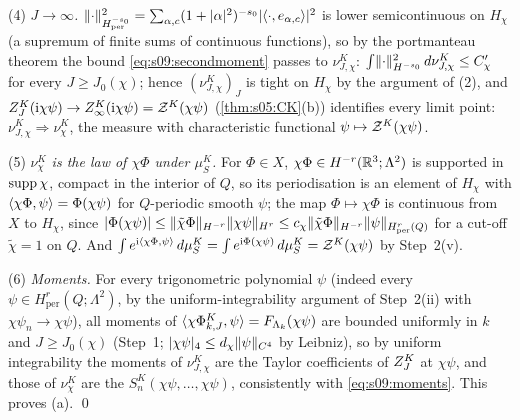 (4) \emph{$J\to\infty$.} $\lVert \cdot\rVert^2_{H^{-s_0}_{\mathrm{per}}}=\sum_{\alpha,c}(1+|\alpha|^2)^{-s_0}|\langle \cdot,e_{\alpha,c}\rangle|^2$ is lower semicontinuous on $H_\chi$ (a supremum of finite sums of continuous functions), so by the portmanteau theorem \cite{Bil99} the bound \eqref{eq:s09:secondmoment} passes to $\nu^K_{J,\chi}$: $\int\lVert \cdot\rVert^2_{H^{-s_0}}\,d\nu^K_{J,\chi}\le C'_\chi$ for every $J\ge J_0(\chi)$; hence $(\nu^K_{J,\chi})_J$ is tight on $H_\chi$ by the argument of (2), and $Z^{K}_{J}(\mathrm i\chi\psi)\to Z^{K}_{\infty}(\mathrm i\chi\psi)=\mathcal Z^K(\chi\psi)$ (\cref{thm:s05:CK}(b)) identifies every limit point: $\nu^K_{J,\chi}\Rightarrow\nu^K_\chi$, the measure with characteristic functional $\psi\mapsto\mathcal Z^K(\chi\psi)$.

(5) \emph{$\nu^K_\chi$ is the law of $\chi\Phi$ under $\mu^K_S$.} For $\Phi\in X$, $\chi\Phi\in H^{-r}(\mathbb R^3;\Lambda^2)$ is supported in $\operatorname{supp}\chi$, compact in the interior of $Q$, so its periodisation is an element of $H_\chi$ with $\langle \chi\Phi,\psi\rangle=\Phi(\chi\psi)$ for $Q$-periodic smooth $\psi$; the map $\Phi\mapsto\chi\Phi$ is continuous from $X$ to $H_\chi$, since $|\Phi(\chi\psi)|\le\lVert \tilde\chi\Phi\rVert_{H^{-r}}\lVert \chi\psi\rVert_{H^r}\le c_\chi\lVert \tilde\chi\Phi\rVert_{H^{-r}}\lVert \psi\rVert_{H^r_{\mathrm{per}}(Q)}$ for a cut-off $\tilde\chi=1$ on $Q$. And $\int e^{\mathrm i\langle \chi\Phi,\psi\rangle}\,d\mu^K_S=\int e^{\mathrm i\Phi(\chi\psi)}\,d\mu^K_S=\mathcal Z^K(\chi\psi)$ by Step~2(v).

(6) \emph{Moments.} For every trigonometric polynomial $\psi$ (indeed every $\psi\in H^r_{\mathrm{per}}(Q;\Lambda^2)$, by the uniform-integrability argument of Step~2(ii) with $\chi\psi_n\to\chi\psi$), all moments of $\langle \chi\Phi^K_{k,J},\psi\rangle=F_{\Lambda_k}(\chi\psi)$ are bounded uniformly in $k$ and $J\ge J_0(\chi)$ (Step~1; $\lvert \chi\psi\rvert_{4}\le d_\chi\lVert \psi\rVert_{C^4}$ by Leibniz), so by uniform integrability the moments of $\nu^K_{J,\chi}$ are the Taylor coefficients of $Z^{K}_{J}$ at $\chi\psi$, and those of $\nu^K_\chi$ are the $S^K_n(\chi\psi,\dots,\chi\psi)$, consistently with \eqref{eq:s09:moments}. This proves (a). \qed


